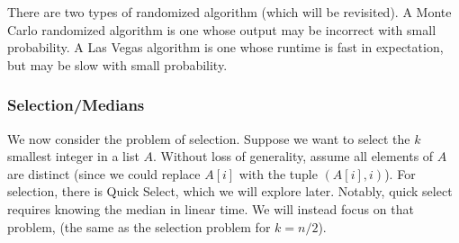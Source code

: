 There are two types of randomized algorithm (which will be revisited). A Monte Carlo randomized algorithm is one whose
output may be incorrect with small probability. A Las Vegas algorithm is one whose runtime is fast in expectation, but may be slow
with small probability.

\subsubsection{Selection/Medians}

We now consider the problem of selection. Suppose we want to select the $k$ smallest integer in a list $A$. Without loss of generality,
assume all elements of $A$ are distinct (since we could replace $A[i]$ with the tuple $(A[i], i)$). For selection, there is Quick Select, which
we will explore later. Notably, quick select requires knowing the median in linear time. We will instead focus on that problem,
(the same as the selection problem for $k = n/2$).

